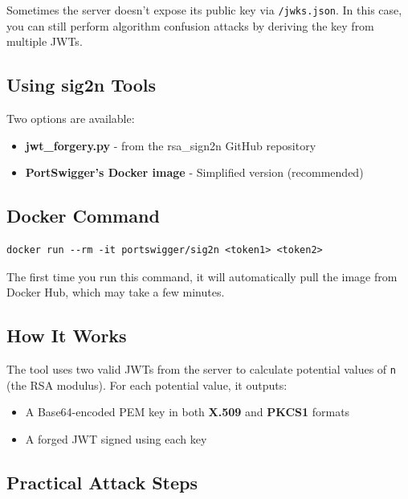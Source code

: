 \documentclass{article}
\begin{document}
Sometimes the server doesn't expose its public key via \texttt{/jwks.json}. In this case, you can still perform algorithm confusion attacks by deriving the key from multiple JWTs.

\subsection{Using sig2n Tools}

Two options are available:
\begin{itemize}
    \item \textbf{jwt\_forgery.py} - from the rsa\_sign2n GitHub repository
    \item \textbf{PortSwigger's Docker image} - Simplified version (recommended)
\end{itemize}

\subsection{Docker Command}

\begin{lstlisting}[caption=Running sig2n with Docker]
docker run --rm -it portswigger/sig2n <token1> <token2>
\end{lstlisting}

\begin{notebox}
The first time you run this command, it will automatically pull the image from Docker Hub, which may take a few minutes.
\end{notebox}

\subsection{How It Works}

The tool uses two valid JWTs from the server to calculate potential values of \texttt{n} (the RSA modulus). For each potential value, it outputs:

\begin{itemize}
    \item A Base64-encoded PEM key in both \textbf{X.509} and \textbf{PKCS1} formats
    \item A forged JWT signed using each key
\end{itemize}

\subsection{Practical Attack Steps}
\end{document}
